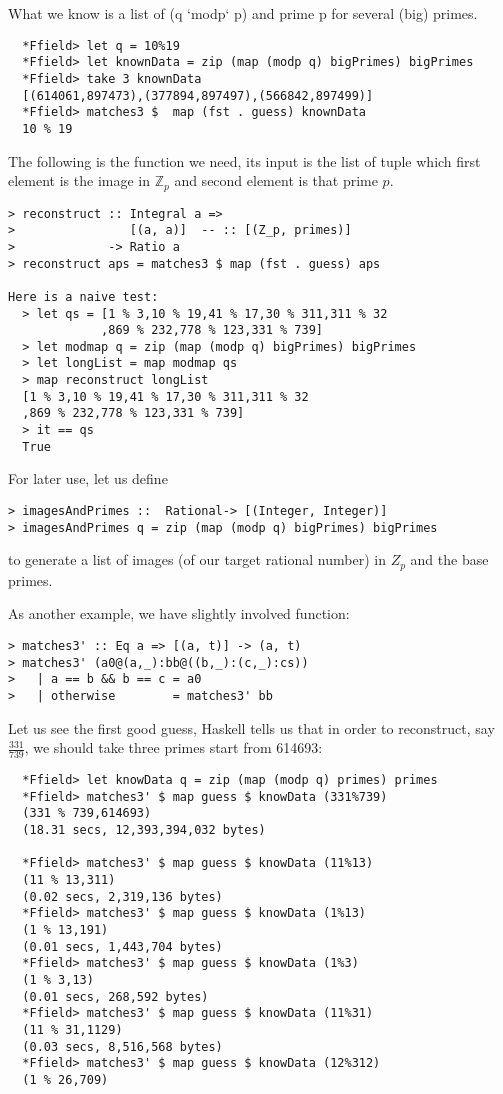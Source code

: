 \documentclass[11pt]{book}
\begin{document}
What we know is a list of (q `modp` p) and prime p for several (big) primes.
\begin{verbatim}
  *Ffield> let q = 10%19
  *Ffield> let knownData = zip (map (modp q) bigPrimes) bigPrimes 
  *Ffield> take 3 knownData 
  [(614061,897473),(377894,897497),(566842,897499)]
  *Ffield> matches3 $  map (fst . guess) knownData
  10 % 19
\end{verbatim}
The following is the function we need, its input is the list of tuple which first element is the image in $\mathbb{Z}_p$ and second element is that prime $p$.
\begin{verbatim}
> reconstruct :: Integral a =>
>                [(a, a)]  -- :: [(Z_p, primes)]
>             -> Ratio a
> reconstruct aps = matches3 $ map (fst . guess) aps

Here is a naive test:
  > let qs = [1 % 3,10 % 19,41 % 17,30 % 311,311 % 32
             ,869 % 232,778 % 123,331 % 739]
  > let modmap q = zip (map (modp q) bigPrimes) bigPrimes 
  > let longList = map modmap qs
  > map reconstruct longList 
  [1 % 3,10 % 19,41 % 17,30 % 311,311 % 32
  ,869 % 232,778 % 123,331 % 739]
  > it == qs
  True
\end{verbatim}

For later use, let us define
\begin{verbatim}
> imagesAndPrimes ::  Rational-> [(Integer, Integer)]
> imagesAndPrimes q = zip (map (modp q) bigPrimes) bigPrimes
\end{verbatim}
to generate a list of images (of our target rational number) in $Z_p$ and the base primes.

As another example, we have slightly involved function:
\begin{verbatim}
> matches3' :: Eq a => [(a, t)] -> (a, t)
> matches3' (a0@(a,_):bb@((b,_):(c,_):cs))
>   | a == b && b == c = a0
>   | otherwise        = matches3' bb
\end{verbatim}
Let us see the first good guess, Haskell tells us that in order to reconstruct, say $\frac{331}{739}$, we should take three primes start from 614693:
\begin{verbatim}
  *Ffield> let knowData q = zip (map (modp q) primes) primes
  *Ffield> matches3' $ map guess $ knowData (331%739)
  (331 % 739,614693)
  (18.31 secs, 12,393,394,032 bytes)
  
  *Ffield> matches3' $ map guess $ knowData (11%13)
  (11 % 13,311)
  (0.02 secs, 2,319,136 bytes)
  *Ffield> matches3' $ map guess $ knowData (1%13)
  (1 % 13,191)
  (0.01 secs, 1,443,704 bytes)
  *Ffield> matches3' $ map guess $ knowData (1%3)
  (1 % 3,13)
  (0.01 secs, 268,592 bytes)
  *Ffield> matches3' $ map guess $ knowData (11%31)
  (11 % 31,1129)
  (0.03 secs, 8,516,568 bytes)
  *Ffield> matches3' $ map guess $ knowData (12%312)
  (1 % 26,709)
\end{verbatim}
\end{document}

